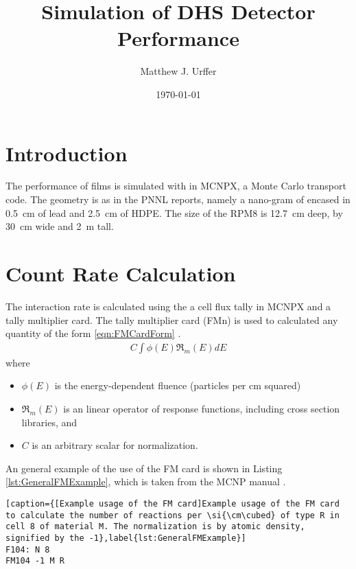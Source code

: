 \documentclass[draftcls,onecolumn]{IEEEtran}
\begin{document}
\title{Simulation of DHS Detector Performance}
\author{Matthew J. Urffer}
\date{\today}
\maketitle

\printnomenclature
\printindex

\listoftodos
\tableofcontents
\listoffigures
\listoftables
\lstlistoflistings
\section{Introduction}

The performance of films is simulated with in MCNPX, a Monte Carlo transport code\cite{pelowitz_mcnpx_????}.
The geometry is as in the PNNL reports, namely a nano-gram of   encased in \SI{0.5}{\cm} of lead and \SI{2.5}{\cm} of HDPE. 
The size of the RPM8 is \SI{12.7}{\cm} deep, by \SI{30}{\cm} wide and \SI{2}{\m} tall.

\section{Count Rate Calculation}
The interaction rate is calculated using the a cell flux tally in MCNPX and a tally multiplier card.
The tally multiplier card (FMn) is used to calculated any quantity of the form \eqref{eqn:FMCardForm} \cite{pelowitz_mcnpx_????}.
\begin{align}
  \label{eqn:FMCardForm}
  C\int\phi(E)\Re_m(E)dE
\end{align}
where
\begin{itemize}
  \item [] $\phi(E)$ is the energy-dependent fluence (particles per cm squared) 
  \item [] $\Re_m (E)$ is an linear operator of response functions, including cross section libraries, and
  \item [] $C$ is an arbitrary scalar for normalization.
\end{itemize}
An general example of the use of the FM card is shown in Listing \ref{lst:GeneralFMExample}, which is taken from the MCNP manual \cite{pelowitz_mcnpx_????}.
\begin{lstlisting}[caption={[Example usage of the FM card]Example usage of the FM card to calculate the number of reactions per \si{\cm\cubed} of type R in cell 8 of material M. The normalization is by atomic density, signified by the -1},label{lst:GeneralFMExample}]
F104: N 8
FM104 -1 M R
\end{lstlisting}
\end{document}
